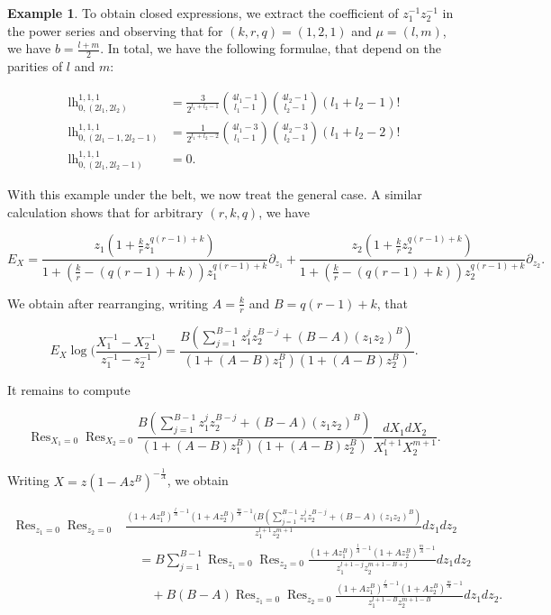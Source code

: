 \documentclass[10pt,a4paper,oneside,no-math,reqno]{amsart}%
\theoremstyle{plain}
\theoremstyle{definition}
\newtheorem{example}[theorem]{Example}
\theoremstyle{remark}
\numberwithin{equation}{section}
\newcommand{\1}{\mathds{1}}
\newcommand{\<}{\langle}
\renewcommand{\>}{\rangle}
\DeclareMathOperator*{\Res}{Res}
\newcommand{\lh}{\mathord{\mathrm{l\!h}}}
\begin{document}
\begin{example}
To obtain closed expressions, we extract the coefficient of $z_1^{-1} z_2^{-1}$ in the power series and observing that for $(k,r,q)=(1,2,1)$ and $\mu=(l,m)$, we have $b=\frac{l+m}{2}$. In total, we have the following formulae, that depend on the parities of $l$ and $m$:

\begin{align}
		\lh^{1,1,1}_{0,(2l_1,2l_2)}
		&=
		\frac{3}{2^{l_1+l_2-1}} \binom{4l_1-1}{l_1-1} \binom{4l_2-1}{l_2-1} (l_1 + l_2 - 1)! \label{h02EvenSimplecase}
		\\
		\lh^{1,1,1}_{0,(2l_1-1,2l_2-1)}
		&=
		\frac{1}{2^{l_1+l_2-2}} \binom{4l_1 -3}{l_1 -1} \binom{4l_2 -3}{l_2 -1} (l_1 + l_2 -2)!
		\\
		\lh^{1,1,1}_{0,(2l_1,2l_2-1)}
		&=
		0 .
	\end{align}
\end{example}


With this example under the belt, we now treat the general case. A similar calculation shows that for arbitrary $(r,k,q)$, we have

\begin{equation}
    E_X
    =
    \frac{z_1 (1 + \frac{k}{r} z_1^{q(r-1)+k})}{1 + (\frac{k}{r} - (q(r-1)+k)) z_1^{q(r-1)+k}} \partial_{z_1} + \frac{z_2 (1 + \frac{k}{r} z_2^{q(r-1)+k})}{1 + (\frac{k}{r} - (q(r-1)+k)) z_2^{q(r-1)+k}} \partial_{z_2}.
\end{equation}

We obtain after rearranging, writing $A=\frac{k}{r}$ and $B=q(r-1)+k$, that

\begin{equation}
    E_X \log \big( \frac{X_1^{-1} - X_2^{-1}}{z_1^{-1} - z_2^{-1}} \big)
    =
    \frac{B( \sum_{j=1}^{B-1} z_1^j z_2^{B-j} + (B-A) (z_1z_2)^B)}{(1 + (A - B) z_1^{B}) (1 + (A - B) z_2^{B})}.
\end{equation}

It remains to compute

\begin{equation}
    \Res_{X_1=0} \Res_{X_2=0}  \frac{B (\sum_{j=1}^{B-1} z_1^j z_2^{B-j} + (B - A) (z_1 z_2)^B)}{(1 + (A - B) z_1^{B}) (1 + (A - B) z_2^{B})} \frac{ dX_1 dX_2 }{X_1^{l+1} X_2^{m+1}}.
\end{equation}

Writing $X=z(1-Az^B)^{-\frac{1}{A}}$, we obtain

\begin{equation}
\begin{split}               
    \Res_{z_1=0} \Res_{z_2=0} & \frac{(1 + A z_1^B)^{\frac{l}{A} - 1}(1 + A z_2^B)^{\frac{m}{A} - 1} (B (\sum_{j=1}^{B-1} z_1^j z_2^{B-j} + (B - A) (z_1 z_2)^B)}{z_1^{l+1} z_2^{m+1}} dz_1 dz_2
    \\
    & \quad=
    B\sum_{j=1}^{B-1} \Res_{z_1=0} \Res_{z_2=0} \frac{(1 + A z_1^B)^{\frac{l}{A} - 1}(1 + A z_2^B)^{\frac{m}{A} - 1}}{z_1^{l+1-j} z_2^{m+1-B+j}} dz_1 dz_2
    \\
    & \qquad
    +B (B - A) \Res_{z_1=0} \Res_{z_2=0} \frac{(1 + A z_1^B)^{\frac{l}{A} - 1}(1 + A z_2^B)^{\frac{m}{A} - 1}}{z_1^{l+1-B} z_2^{m+1-B}} dz_1 dz_2.
\end{split}
\end{equation}
\end{document}
